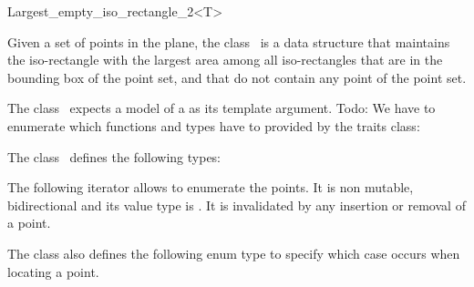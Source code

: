 

\begin{ccRefClass}{Largest_empty_iso_rectangle_2<T>}


\ccDefinition
  
Given a set of points in the plane, the class \ccRefName\ is a data
structure that maintains the iso-rectangle with the largest area among
all iso-rectangles that are in the bounding box of the point set, and
that do not contain any point of the point set.

The class \ccRefName\ expects a model of a  as its template argument.  Todo: We have to enumerate which
functions and types have to provided by the traits class: 



\ccTypes
The class \ccClassTemplateName\ defines the following types:

\ccThreeToTwo


\ccGlue
{}


The following iterator allows to enumerate the points. 
It is non mutable, bidirectional
and its value type is . 
It is invalidated by any insertion or removal of a point. 



The \ccRefName class also defines the following enum type to specify
which case occurs when locating a point. 

{}


\ccCreation
{}  %


\end{ccRefClass}

